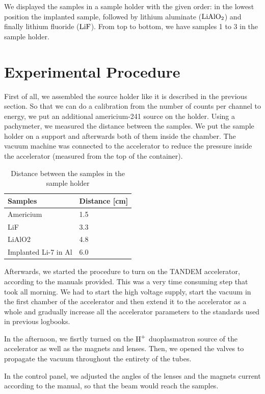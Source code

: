 \documentclass{article}
\begin{document}
We displayed the samples in a sample holder with the given order: in the lowest position the implanted sample, followed by lithium aluminate ($\ce{LiAlO2}$) and finally lithium fluoride ($\ce{LiF}$). From top to bottom, we have samples 1 to 3 in the sample holder.

\section{Experimental Procedure}

First of all, we assembled the source holder like it is described in the previous section. So that we can do a calibration from the number of counts per channel to energy, we put an additional americium-241 source on the holder.
Using a pachymeter, we measured the distance between the samples. We put the sample holder on a support and afterwards both of them inside the chamber. The vacuum machine was connected to the accelerator to reduce the pressure inside the accelerator (measured from the top of the container). 

\begin{table}[h!]
\centering
\begin{tabular}{|w{4cm}|w{3cm}|}
\hline
Samples & Distance [cm]  \\ \hline
Americium & 1.5  \\ \hline
LiF & 3.3 \\ \hline
LiAlO2 & 4.8  \\ \hline
Implanted Li-7 in Al & 6.0  \\ \hline
\end{tabular}
\caption{Distance between the samples in the sample holder}
\label{tab:samples}
\end{table}

Afterwards, we started the procedure to turn on the TANDEM accelerator, according to the manuals provided. This was a very time consuming step that took all morning. We had to start the high voltage supply, start the vacuum in the first chamber of the accelerator and then extend it to the accelerator as a whole and gradually increase all the accelerator parameters to the standards used in previous logbooks.

In the afternoon, we fisrtly turned on the $\ce{H^+}$ duoplasmatron source of the accelerator as well as the magnets and lenses. Then, we opened the valves to propagate the vacuum throughout the entirety of the tubes.

In the control panel, we adjusted the angles of the lenses and the magnets current according to the manual, so that the beam would reach the samples. 
\end{document}
